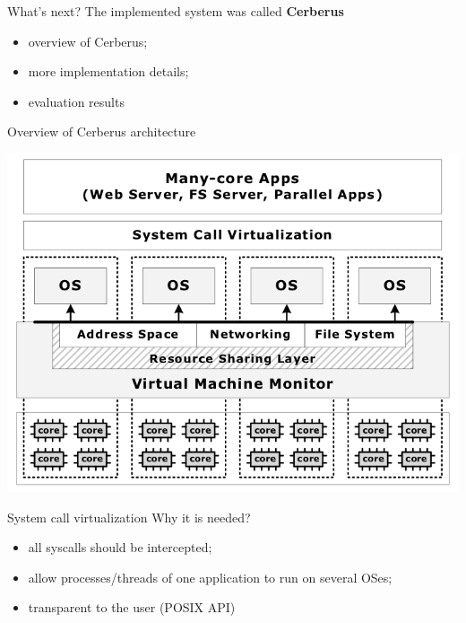 \documentclass{beamer}
\begin{document}
\begin{frame}[t]{What's next?}
  The implemented system was called \textbf{Cerberus}
  \newline 

  \begin{itemize}
    \item overview of Cerberus;
    \item more implementation details;
    \item evaluation results
  \end{itemize}
\end{frame}

\begin{frame}{Overview of Cerberus architecture}
  \begin{center}
    \includegraphics[scale=0.3]{overview.png}
  \end{center}
\end{frame}

\begin{frame}{System call virtualization}
  Why it is needed?
  \begin{itemize}
    \item all syscalls should be intercepted;
    \item allow processes/threads of one application to run on several
      OSes;
    \item transparent to the user (POSIX API)
  \end{itemize}
\end{frame}
\end{document}
